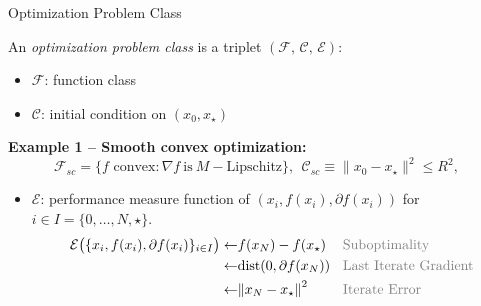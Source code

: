 \documentclass[9pt]{beamer}
\begin{document}
\begin{frame}{Optimization Problem Class}

  An \emph{optimization problem class} is a triplet $(\mathcal{F},\, \mathcal{C},\, \mathcal{E})$:
  \begin{itemize}
    \item $\mathcal{F}$: function class
    \item $\mathcal{C}$: initial condition on $(x_0, x_\star)$
  \end{itemize}

  \vfill

  \textbf{Example 1 – Smooth convex optimization:}
  \[
    \mathcal{F}_{sc} = \{f \text{ convex}: \nabla f ~\text{is}~ M-\text{Lipschitz}\},~~
    \mathcal{C}_{sc} \equiv \|x_0 - x_\star\|^2 \leq R^2, ~~
  \]

  \vfill


  \vfill
  
  \begin{itemize}
  \item<3-> $\mathcal{E}$: performance measure function of $(x_i, f(x_i), \partial f(x_i))$ for $i\in I=\{0, \dots, N, \star\}$.
    \begin{align*}
      \mathcal{E}\bigl(\{x_i, f(x_i), \partial f(x_i)\}_{i\in I}\bigr)\leftarrow & \makebox[2.3cm][l]{$f(x_N)-f(x_\star)$} \quad {\color{gray}\text{Suboptimality}}\\
      \leftarrow & \makebox[2.3cm][l]{${\rm{dist}}(0, \partial f(x_N))$}\quad  {\color{gray}\text{Last Iterate Gradient}}\\
                   \leftarrow & \makebox[2.3cm][l]{$\norm{x_N-x_\star}^2$} \quad {\color{gray}\text{Iterate Error}}
    \end{align*}
  \end{itemize}
 
  
\end{frame}
\end{document}
